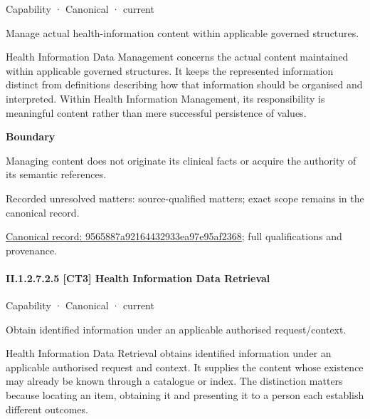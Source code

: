 \label{element:9565887a92164432933ea97e95af2368}
{\small Capability · Canonical · current}\par

Manage actual health-information content within applicable governed structures.



Health Information Data Management concerns the actual content maintained within applicable governed structures. It keeps the represented information distinct from definitions describing how that information should be organised and interpreted. Within Health Information Management, its responsibility is meaningful content rather than mere successful persistence of values.



\textbf{Boundary}



Managing content does not originate its clinical facts or acquire the authority of its semantic references.


{\small Recorded unresolved matters: source-qualified matters; exact scope remains in the canonical record.}\par
{\footnotesize \href{../../../../../../../continuum/strategy/capability/9565887a92164432933ea97e95af2368.md}{Canonical record: 9565887a92164432933ea97e95af2368}; full qualifications and provenance.}\par
\paragraph*{II.1.2.7.2.5 [CT3] Health Information Data Retrieval}
\label{navigation:II.1.2.7.2.5}

\label{element:082760fc4804489a81eaed3e4fd9daa9}
{\small Capability · Canonical · current}\par

Obtain identified information under an applicable authorised request/context.



Health Information Data Retrieval obtains identified information under an applicable authorised request and context. It supplies the content whose existence may already be known through a catalogue or index. The distinction matters because locating an item, obtaining it and presenting it to a person each establish different outcomes.



